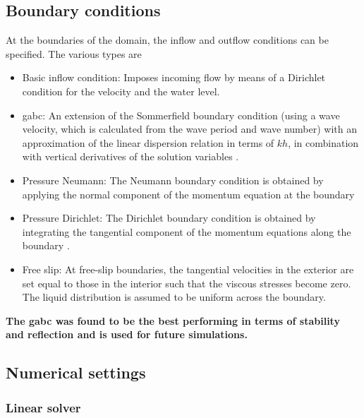 \subsection{Boundary conditions}
At the boundaries of the domain, the inflow and outflow conditions can be specified. The various types are
\begin{itemize}
    \item Basic inflow condition: Imposes incoming flow by means of a Dirichlet condition for the velocity and the water level. 
    \item \acrfull{gabc}: An extension of the Sommerfield boundary condition (using a wave velocity, which is calculated from the wave period and wave number) with an approximation of the linear dispersion relation in terms of $k h$, in combination with vertical derivatives of the solution variables \parencite{Wellens2020}. 
    \item Pressure Neumann: The Neumann boundary condition is obtained by applying the normal component of the momentum equation at the boundary \parencite{Abdallah1988} 
    
    \item Pressure Dirichlet: The Dirichlet boundary condition is obtained by integrating the tangential component of the momentum equations along the boundary \parencite{Abdallah1988}.
    \item Free slip: At free-slip boundaries, the tangential velocities in the exterior are set equal to those in the interior such that the viscous stresses become zero. The liquid distribution is assumed to be uniform across the boundary. 
\end{itemize}


\textbf{The \acrshort{gabc} was found to be the best performing in terms of stability and reflection and is used for future simulations.}

\subsection{Numerical settings}
\label{subsec: numercial settings validation}
\subsubsection{Linear solver}

